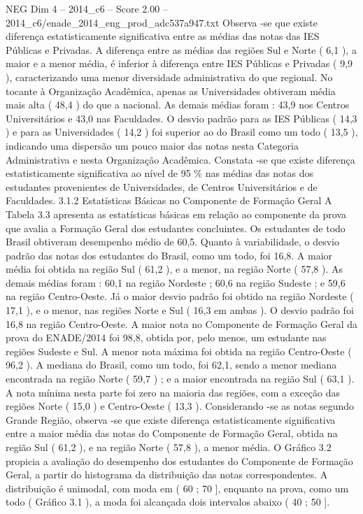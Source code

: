 \begin{textsample}{NEG Dim 4 – 2014\_c6 – Score 2.00 – 2014\_c6/enade\_2014\_eng\_prod\_adc537a947.txt}
Observa -se que existe diferença estatisticamente significativa entre as médias das notas das IES Públicas e Privadas.
A diferença entre as médias das regiões Sul e Norte ( 6,1 ), a maior e a menor média, é inferior à diferença entre IES Públicas e Privadas ( 9,9 ), caracterizando uma menor diversidade administrativa do que regional.
No tocante à Organização Acadêmica, apenas as Universidades obtiveram média mais alta ( 48,4 ) do que a nacional.
As demais médias foram : 43,9 nos Centros Universitários e 43,0 nas Faculdades.
O desvio padrão para as IES Públicas ( 14,3 ) e para as Universidades ( 14,2 ) foi superior ao do Brasil como um todo ( 13,5 ), indicando uma dispersão um pouco maior das notas nesta Categoria Administrativa e nesta Organização Acadêmica.
Constata -se que existe diferença estatisticamente significativa ao nível de 95 \% nas médias das notas dos estudantes provenientes de Universidades, de Centros Universitários e de Faculdades. 3.1.2 Estatísticas Básicas no Componente de Formação Geral A Tabela 3.3 apresenta as estatísticas básicas em relação ao componente da prova que avalia a Formação Geral dos estudantes concluintes.
Os estudantes de todo Brasil obtiveram desempenho médio de 60,5.
Quanto à variabilidade, o desvio padrão das notas dos estudantes do Brasil, como um todo, foi 16,8.
A maior média foi obtida na região Sul ( 61,2 ), e a menor, na região Norte ( 57,8 ).
As demais médias foram : 60,1 na região Nordeste ; 60,6 na região Sudeste ; e 59,6 na região Centro-Oeste.
Já o maior desvio padrão foi obtido na região Nordeste ( 17,1 ), e o menor, nas regiões Norte e Sul ( 16,3 em ambas ).
O desvio padrão foi 16,8 na região Centro-Oeste.
A maior nota no Componente de Formação Geral da prova do ENADE/2014 foi 98,8, obtida por, pelo menos, um estudante nas regiões Sudeste e Sul.
A menor nota máxima foi obtida na região Centro-Oeste ( 96,2 ).
A mediana do Brasil, como um todo, foi 62,1, sendo a menor mediana encontrada na região Norte ( 59,7 ) ; e a maior encontrada na região Sul ( 63,1 ).
A nota mínima nesta parte foi zero na maioria das regiões, com a exceção das regiões Norte ( 15,0 ) e Centro-Oeste ( 13,3 ).
Considerando -se as notas segundo Grande Região, observa -se que existe diferença estatisticamente significativa entre a maior média das notas do Componente de Formação Geral, obtida na região Sul ( 61,2 ), e na região Norte ( 57,8 ), a menor média.
O Gráfico 3.2 propicia a avaliação do desempenho dos estudantes do Componente de Formação Geral, a partir do histograma da distribuição das notas correspondentes.
A distribuição é unimodal, com moda em ( 60 ; 70 ], enquanto na prova, como um todo ( Gráfico 3.1 ), a moda foi alcançada dois intervalos abaixo ( 40 ; 50 ].

\end{textsample}
